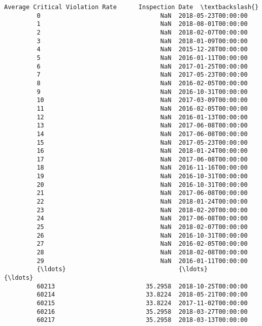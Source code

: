 \documentclass[11pt]{article}
\begin{document}
\begin{Verbatim}[commandchars=\\\{\}]
               Average Critical Violation Rate      Inspection Date  \textbackslash{}
         0                                 NaN  2018-05-23T00:00:00   
         1                                 NaN  2018-08-01T00:00:00   
         2                                 NaN  2018-02-07T00:00:00   
         3                                 NaN  2018-01-09T00:00:00   
         4                                 NaN  2015-12-28T00:00:00   
         5                                 NaN  2016-01-11T00:00:00   
         6                                 NaN  2017-01-25T00:00:00   
         7                                 NaN  2017-05-23T00:00:00   
         8                                 NaN  2016-02-05T00:00:00   
         9                                 NaN  2016-10-31T00:00:00   
         10                                NaN  2017-03-09T00:00:00   
         11                                NaN  2016-02-05T00:00:00   
         12                                NaN  2016-01-13T00:00:00   
         13                                NaN  2017-06-08T00:00:00   
         14                                NaN  2017-06-08T00:00:00   
         15                                NaN  2017-05-23T00:00:00   
         16                                NaN  2018-01-24T00:00:00   
         17                                NaN  2017-06-08T00:00:00   
         18                                NaN  2016-11-16T00:00:00   
         19                                NaN  2016-10-31T00:00:00   
         20                                NaN  2016-10-31T00:00:00   
         21                                NaN  2017-06-08T00:00:00   
         22                                NaN  2018-01-24T00:00:00   
         23                                NaN  2018-02-20T00:00:00   
         24                                NaN  2017-06-08T00:00:00   
         25                                NaN  2018-02-07T00:00:00   
         26                                NaN  2016-10-31T00:00:00   
         27                                NaN  2016-02-05T00:00:00   
         28                                NaN  2018-02-08T00:00:00   
         29                                NaN  2016-01-11T00:00:00   
         {\ldots}                               {\ldots}                  {\ldots}   
         60213                         35.2958  2018-10-25T00:00:00   
         60214                         33.8224  2018-05-21T00:00:00   
         60215                         33.8224  2017-11-02T00:00:00   
         60216                         35.2958  2018-03-27T00:00:00   
         60217                         35.2958  2018-03-13T00:00:00   

\end{Verbatim}
\end{document}
